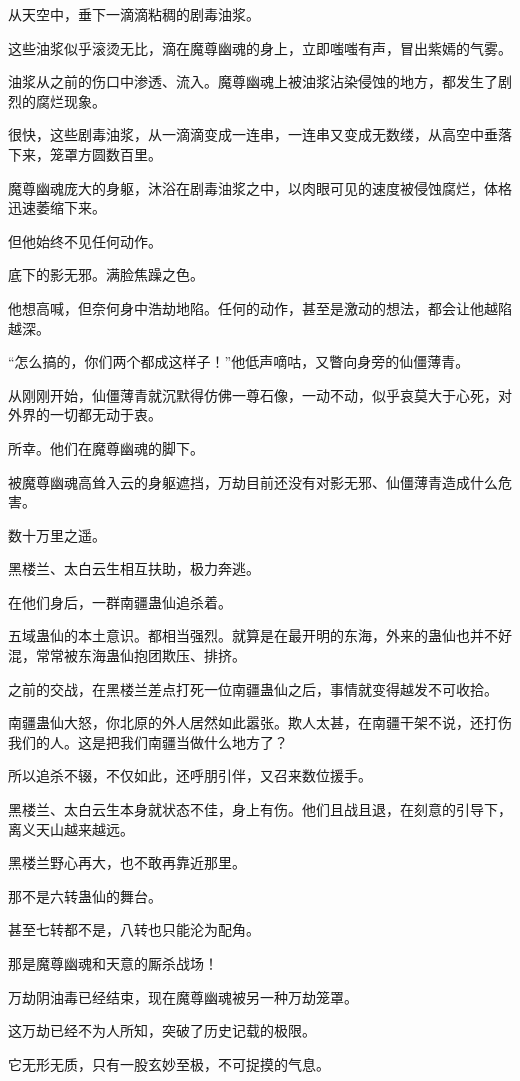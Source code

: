 \begin{this_body}
从天空中，垂下一滴滴粘稠的剧毒油浆。

这些油浆似乎滚烫无比，滴在魔尊幽魂的身上，立即嗤嗤有声，冒出紫嫣的气雾。

油浆从之前的伤口中渗透、流入。魔尊幽魂上被油浆沾染侵蚀的地方，都发生了剧烈的腐烂现象。

很快，这些剧毒油浆，从一滴滴变成一连串，一连串又变成无数缕，从高空中垂落下来，笼罩方圆数百里。

魔尊幽魂庞大的身躯，沐浴在剧毒油浆之中，以肉眼可见的速度被侵蚀腐烂，体格迅速萎缩下来。

但他始终不见任何动作。

底下的影无邪。满脸焦躁之色。

他想高喊，但奈何身中浩劫地陷。任何的动作，甚至是激动的想法，都会让他越陷越深。

“怎么搞的，你们两个都成这样子！”他低声嘀咕，又瞥向身旁的仙僵薄青。

从刚刚开始，仙僵薄青就沉默得仿佛一尊石像，一动不动，似乎哀莫大于心死，对外界的一切都无动于衷。

所幸。他们在魔尊幽魂的脚下。

被魔尊幽魂高耸入云的身躯遮挡，万劫目前还没有对影无邪、仙僵薄青造成什么危害。

数十万里之遥。

黑楼兰、太白云生相互扶助，极力奔逃。

在他们身后，一群南疆蛊仙追杀着。

五域蛊仙的本土意识。都相当强烈。就算是在最开明的东海，外来的蛊仙也并不好混，常常被东海蛊仙抱团欺压、排挤。

之前的交战，在黑楼兰差点打死一位南疆蛊仙之后，事情就变得越发不可收拾。

南疆蛊仙大怒，你北原的外人居然如此嚣张。欺人太甚，在南疆干架不说，还打伤我们的人。这是把我们南疆当做什么地方了？

所以追杀不辍，不仅如此，还呼朋引伴，又召来数位援手。

黑楼兰、太白云生本身就状态不佳，身上有伤。他们且战且退，在刻意的引导下，离义天山越来越远。

黑楼兰野心再大，也不敢再靠近那里。

那不是六转蛊仙的舞台。

甚至七转都不是，八转也只能沦为配角。

那是魔尊幽魂和天意的厮杀战场！

万劫阴油毒已经结束，现在魔尊幽魂被另一种万劫笼罩。

这万劫已经不为人所知，突破了历史记载的极限。

它无形无质，只有一股玄妙至极，不可捉摸的气息。


\end{this_body}
